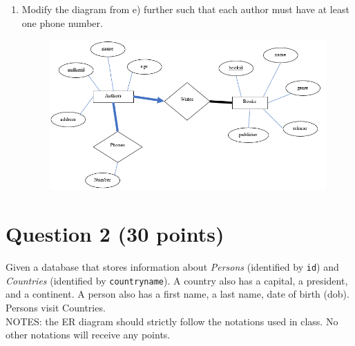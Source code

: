 \documentclass[letterpaper, 11pt]{article}
\begin{document}
\begin{enumerate}[label={\alph*})]
\begin{figure}[H]
    \end{figure}
    \item Modify the diagram from e) further such that each author must have at least one phone number.
    \begin{figure}[H]
        \centering
        \includegraphics[scale=0.7]{hw2-1f.png}
    \end{figure}
\end{enumerate}

\section*{Question 2 (30 points)}

Given a database that stores information about \textit{Persons} (identified by \texttt{id}) and \textit{Countries} (identified by \texttt{countryname}). A country also has a capital, a president, and a continent. A person also has a first name, a last name, date of birth (dob). Persons visit Countries.\\
NOTES: the ER diagram should strictly follow the notations used in class. No other notations will receive any points.
\end{document}
